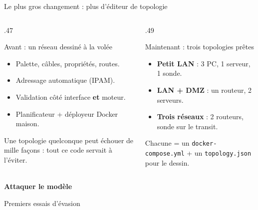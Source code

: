 \documentclass[aspectratio=169,11pt,xcolor=table]{beamer}
\begin{document}
\begin{frame}{Le plus gros changement : plus d'éditeur de topologie}
  \begin{columns}[T]
    \begin{column}{.47\linewidth}
      \begin{block}{Avant : un réseau dessiné à la volée}
        \begin{itemize}
          \item Palette, câbles, propriétés, routes.
          \item Adressage automatique (IPAM).
          \item Validation côté interface \textbf{et} moteur.
          \item Planificateur + déployeur Docker maison.
        \end{itemize}
        Une topologie quelconque peut échouer de mille façons : tout ce code servait à l'éviter.
      \end{block}
    \end{column}
    \begin{column}{.49\linewidth}
      \begin{block}{Maintenant : trois topologies prêtes}
        \begin{itemize}
          \item \textbf{Petit LAN} : 3 PC, 1 serveur, 1 sonde.
          \item \textbf{LAN + DMZ} : un routeur, 2 serveurs.
          \item \textbf{Trois réseaux} : 2 routeurs, sonde sur le transit.
        \end{itemize}
        Chacune = un \texttt{docker-compose.yml} + un \texttt{topology.json} pour le dessin.
      \end{block}
    \end{column}
  \end{columns}
\end{frame}


\begin{frame}[plain]
  \centering
  \vfill
  {\fontsize{28}{36}\selectfont\bfseries\color{projectblue} Attaquer le modèle\par}
  \vspace{.8em}
  {\large Premiers essais d'évasion\par}
  \vfill
\end{frame}
\end{document}
